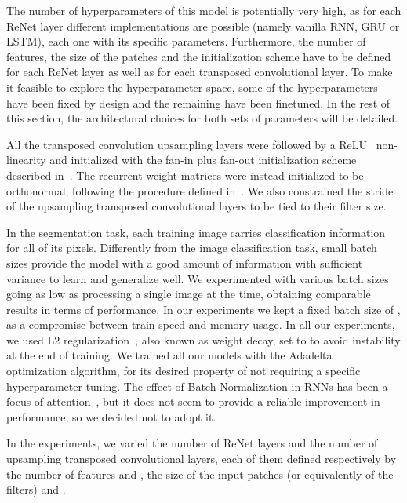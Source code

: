\documentclass[times,art10,twocolumn,latex8]{article}
\begin{document}
The number of hyperparameters of this model is potentially very high, as for
each ReNet layer different implementations are possible (namely vanilla RNN,
GRU or LSTM), each one with its specific parameters. Furthermore, the number of
features, the size of the patches and the initialization scheme have to be
defined for each ReNet layer as well as for each transposed convolutional
layer. To make it feasible to explore the hyperparameter space, some of the
hyperparameters have been fixed by design and the remaining have been finetuned.
In the rest of this section, the architectural choices for both sets of
parameters will be detailed.

All the transposed convolution upsampling layers were followed by a
ReLU~\cite{Krizhevsky2012-alexnet} non-linearity and initialized with the
fan-in plus fan-out initialization scheme described
in~\cite{glorot2010understanding}. The recurrent weight matrices were instead
initialized to be orthonormal, following the procedure defined
in~\cite{Saxe2014}. We also constrained the stride of the upsampling transposed
convolutional layers to be tied to their filter size.

In the segmentation task, each training image carries classification
information for all of its pixels. Differently from the image classification
task, small batch sizes provide the model with a good amount of information
with sufficient variance to learn and generalize well. We experimented with
various batch sizes going as low as processing a single image at the time,
obtaining comparable results in terms of performance. In our experiments we
kept a fixed batch size of , as a compromise between train speed and memory
usage. In all our experiments, we used L2
regularization~\cite{Krogh92asimple}, also known as weight decay, set to
 to avoid instability at the end of training. We trained all our models
with the Adadelta~\cite{Zeiler-2012} optimization algorithm, for its desired
property of not requiring a specific hyperparameter tuning. The effect of Batch
Normalization in RNNs has been a focus of attention~\cite{Laurent2015}, but it
does not seem to provide a reliable improvement in performance, so we decided
not to adopt it.


In the experiments, we varied the number of ReNet layers and the number of
upsampling transposed convolutional layers, each of them defined respectively
by the number of features  and ,
the size of the input patches (or equivalently of the filters)
 and .
\end{document}
